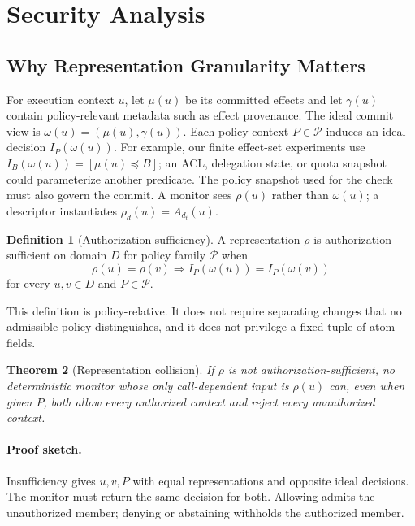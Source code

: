 \documentclass[letterpaper,twocolumn,10pt]{article}
\newtheorem{theorem}{Theorem}
\theoremstyle{definition}
\newtheorem{definition}[theorem]{Definition}
\begin{document}
\section{Security Analysis}
\label{sec:security-analysis}

\subsection{Why Representation Granularity Matters}

For execution context $u$, let $\mu(u)$ be its committed effects and let
$\gamma(u)$ contain policy-relevant metadata such as effect provenance.  The
ideal commit view is $\omega(u)=(\mu(u),\gamma(u))$.  Each policy context
$P\in\mathcal P$ induces an ideal decision $I_P(\omega(u))$.  For example, our
finite effect-set experiments use $I_B(\omega(u))=[\mu(u)\preceq B]$; an ACL,
delegation state, or quota snapshot could parameterize another predicate.  The
policy snapshot used for the check must also govern the commit.  A monitor sees
$\rho(u)$ rather than $\omega(u)$; a descriptor instantiates
$\rho_d(u)=A_{d_t}(u)$.

\begin{definition}[Authorization sufficiency]
\label{def:authorization-equivalence}
A representation $\rho$ is authorization-sufficient on domain $D$ for policy
family $\mathcal P$ when
\[
 \rho(u)=\rho(v) \Longrightarrow
 I_P(\omega(u))=I_P(\omega(v))
\]
for every $u,v\in D$ and $P\in\mathcal P$.
\end{definition}

This definition is policy-relative.  It does not require separating changes
that no admissible policy distinguishes, and it does not privilege a fixed
tuple of atom fields.

\begin{theorem}[Representation collision]
\label{thm:representation-insufficiency}
If $\rho$ is not authorization-sufficient, no deterministic monitor whose only
call-dependent input is $\rho(u)$ can, even when given $P$, both allow every
authorized context and reject every unauthorized context.
\end{theorem}

\paragraph{Proof sketch.}
Insufficiency gives $u,v,P$ with equal representations and opposite ideal
decisions.  The monitor must return the same decision for both.  Allowing
admits the unauthorized member; denying or abstaining withholds the authorized
member.
\end{document}
